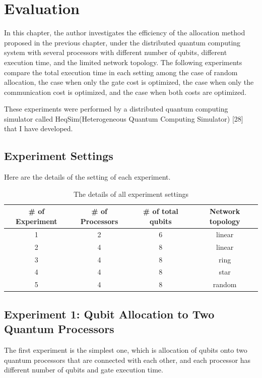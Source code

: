 \chapter{Evaluation}

 In this chapter, the author investigates the efficiency of the allocation method proposed in the previous chapter, under the distributed quantum computing system with several processors with different number of qubits, different execution time, and the limited network topology.  The following experiments compare the total execution time in each setting among the case of random allocation, the case when only the gate cost is optimized, the case when only the communication cost is optimized, and the case when both costs are optimized.
  
  These experiments were performed by a distributed quantum computing simulator called HeqSim(Heterogeneous Quantum Computing Simulator) [28] that I have developed.
  
\section{Experiment Settings}
 
 Here are the details of the setting of each experiment.
 
\begin{table}[htb]
\centering
  \caption{The details of all experiment settings}
 \begin{tabular}{|c|c|c|c|} \hline
 	\# of Experiment & \# of Processors & \# of total qubits & Network topology \\ \hline
	1 & 2 & 6 & linear \\ \hline
	2 & 4 & 8 & linear \\ \hline
	3 & 4 & 8 & ring \\ \hline
	4 & 4 & 8 & star \\ \hline
	5 & 4 & 8 & random \\ \hline
 \end{tabular}
 \end{table}
 
 \newpage
 
 \section{Experiment 1: Qubit Allocation to Two Quantum Processors}
 
 The first experiment is the simplest one, which is allocation of qubits onto two quantum processors that are connected with each other,  and each processor has different number of qubits and gate execution time.
 
